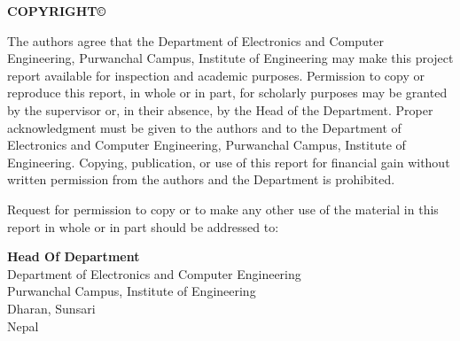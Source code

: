 \thispagestyle{plain} 
\begin{center} 
    \textbf{\fontsize{14pt}{16pt}
    \selectfont COPYRIGHT©} 
\end{center} 
\vspace{1em} The authors agree that the Department of Electronics and Computer Engineering, Purwanchal Campus, Institute of Engineering may make this project report available for inspection and academic purposes. Permission to copy or reproduce this report, in whole or in part, for scholarly purposes may be granted by the supervisor or, in their absence, by the Head of the Department. Proper acknowledgment must be given to the authors and to the Department of Electronics and Computer Engineering, Purwanchal Campus, Institute of Engineering. Copying, publication, or use of this report for financial gain without written permission from the authors and the Department is prohibited. 

Request for permission to copy or to make any other use of the material in this report in whole or in part should be addressed to:\vspace{1.5em} \noindent 

\textbf{Head Of Department}\\ Department of Electronics and Computer Engineering\\ 
Purwanchal Campus, Institute of Engineering\\ Dharan, Sunsari\\ Nepal \clearpage